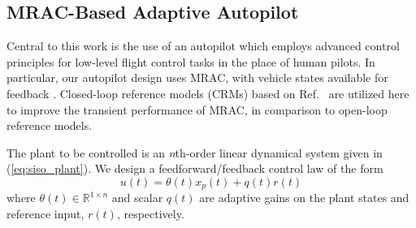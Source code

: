 \subsection{MRAC-Based Adaptive Autopilot}
Central to this work is the use of an autopilot which employs advanced control principles for low-level flight control tasks in the place of human pilots. In particular, our autopilot design uses MRAC, with vehicle states available for feedback \cite{narendra2012stable}. Closed-loop reference models (CRMs) based on Ref.~\cite{gibson2013adaptive} are utilized here to improve the transient performance of MRAC, in comparison to open-loop reference models.

The plant to be controlled is an \textit{n}th-order linear dynamical system given in (\ref{eq:siso_plant}). We design a feedforward/feedback control law of the form
\begin{equation}
	u(t) = \theta(t) x_p(t) + q(t) r(t)
	\label{eqn:control_law}
\end{equation}
\noindent where $\theta(t) \in \mathbb{R}^{1 \times n}$ and scalar $q(t)$ are adaptive gains on the plant states and reference input, $r(t)$, respectively.

